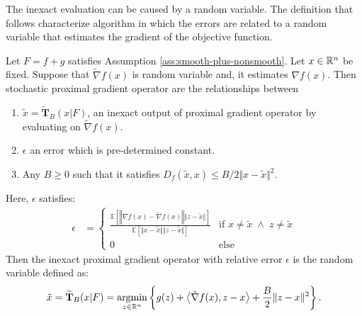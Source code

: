 \documentclass[12pt]{article}
\newcommand{\expect}{\ensuremath{\mathbb E}}
\begin{document}
    The inexact evaluation can be caused by a random variable. 
    The definition that follows characterize algorithm in which the errors are related to a random variable that estimates the gradient of the objective function. 
    \begin{definition}\label{def:stoch-pg-opt-rel-err}
        Let $F = f + g$ satisfies Assumption \ref{ass:smooth-plus-nonsmooth}. 
        Let $x \in \mathbb R^n$ be fixed. 
        Suppose that $\tilde \nabla f(x)$ is random variable and, it estimates $\nabla f(x)$. 
        Then stochastic proximal gradient operator are the relationships between
        \begin{enumerate}[nosep]
            \item $\tilde x= \mathbf{\widetilde T}_B(x| F)$, an inexact output of proximal gradient operator by evaluating on $\tilde \nabla f(x)$. 
            \item $\epsilon$ an error which is pre-determined constant. 
            \item Any $B \ge 0$ such that it satisfies $D_f(\tilde x, x) \le B/2\Vert x - \tilde x\Vert^2$. 
        \end{enumerate}
        Here, $\epsilon$ satisfies: 
        \begin{align*}
            \epsilon 
            &= 
            \begin{cases}
                \frac{
                \expect \left[
                    \left\Vert \nabla f(x) - \tilde \nabla f(x) \right\Vert \Vert z - \tilde x\Vert
                \right]
                }{\expect \left[
                    \Vert x - \tilde x\Vert\Vert z - \tilde x\Vert
                \right]} & \text{if } x \neq \tilde x \;\wedge\; z \neq \tilde x
                \\
                0 & \text{else }
            \end{cases}
        \end{align*}
        Then the inexact proximal gradient operator with relative error $\epsilon$ is the random variable defined as: 
        \begin{align*}
            \tilde x = \mathbf{\widetilde T}_B(x| F) = \mathop{\rm argmin}\limits_{z \in \mathbb R^n}\left\lbrace
                g(z) + \left\langle \tilde \nabla f(x), z - x\right\rangle
                + \frac{B}{2}\Vert z - x\Vert^2
            \right\rbrace. 
        \end{align*}
    \end{definition}
\end{document}
